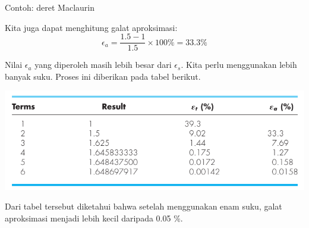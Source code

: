 \begin{frame}[fragile]{Contoh: deret Maclaurin}
\fontsize{9}{10}\selectfont

Kita juga dapat menghitung galat aproksimasi:
$$
\epsilon_{a} = \frac{1.5 - 1}{1.5} \times 100\% = 33.3 \% 
$$

Nilai $\epsilon_a$ yang diperoleh masih lebih besar dari $\epsilon_s$. Kita
perlu menggunakan lebih banyak suku. Proses ini diberikan pada tabel berikut.

{\centering
\includegraphics[height=0.4\textheight]{../chapra_7th/Chapra_Table_Example_3_2.png}
\par}

Dari tabel tersebut diketahui bahwa setelah menggunakan enam suku, galat aproksimasi
menjadi lebih kecil daripada 0.05 \%.


\end{frame}









